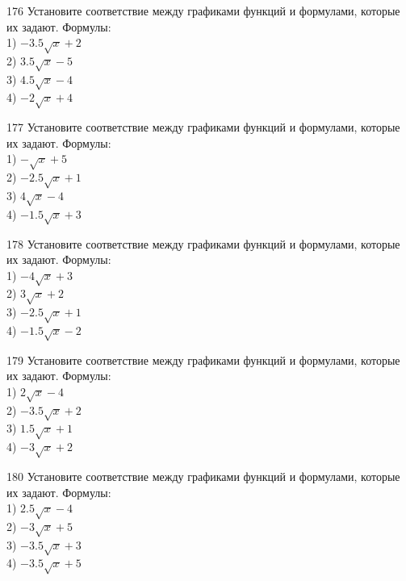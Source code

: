 \documentclass[4apaper]{article}
\begin{document}
\begin{taskBN}{176}
Установите соответствие между графиками функций и формулами, которые их задают. Формулы: \\1) $-3.5\sqrt{x}+2$\\2) $3.5\sqrt{x}-5$\\3) $4.5\sqrt{x}-4$\\4) $-2\sqrt{x}+4$
\end{taskBN}

\begin{taskBN}{177}
Установите соответствие между графиками функций и формулами, которые их задают. Формулы: \\1) $-\sqrt{x}+5$\\2) $-2.5\sqrt{x}+1$\\3) $4\sqrt{x}-4$\\4) $-1.5\sqrt{x}+3$
\end{taskBN}

\begin{taskBN}{178}
Установите соответствие между графиками функций и формулами, которые их задают. Формулы: \\1) $-4\sqrt{x}+3$\\2) $3\sqrt{x}+2$\\3) $-2.5\sqrt{x}+1$\\4) $-1.5\sqrt{x}-2$
\end{taskBN}

\begin{taskBN}{179}
Установите соответствие между графиками функций и формулами, которые их задают. Формулы: \\1) $2\sqrt{x}-4$\\2) $-3.5\sqrt{x}+2$\\3) $1.5\sqrt{x}+1$\\4) $-3\sqrt{x}+2$
\end{taskBN}

\begin{taskBN}{180}
Установите соответствие между графиками функций и формулами, которые их задают. Формулы: \\1) $2.5\sqrt{x}-4$\\2) $-3\sqrt{x}+5$\\3) $-3.5\sqrt{x}+3$\\4) $-3.5\sqrt{x}+5$
\end{taskBN}
\end{document}
